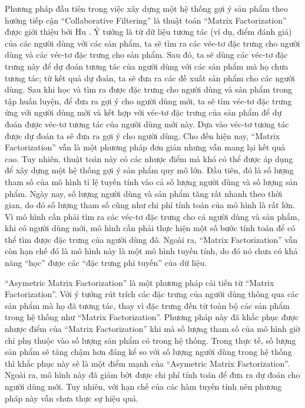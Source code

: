 Phương pháp đầu tiên trong việc xây dựng một hệ thống gợi ý sản phẩm theo hướng tiếp cận ``Collaborative Filtering'' là thuật toán ``Matrix Factorization'' được giới thiệu bởi Hu \cite{MF}. 
Ý tưởng là từ dữ liệu tương tác (ví dụ, điểm đánh giá) của các người dùng với các sản phẩm, ta sẽ tìm ra các véc-tơ đặc trưng cho người dùng và các véc-tơ đặc trưng cho sản phẩm. 
Sau đó, ta sẽ dùng các véc-tơ đặc trưng này để dự đoán tương tác của người dùng với các sản phẩm mà họ chưa tương tác; từ kết quả dự đoán, ta sẽ đưa ra các đề xuất sản phẩm cho các người dùng.
Sau khi học và tìm ra được đặc trưng cho người dùng và sản phẩm trong tập huấn luyện, để đưa ra gợi ý cho người dùng mới, ta sẽ tìm véc-tơ đặc trưng ứng với người dùng mới và kết hợp với véc-tơ đặc trưng của sản phẩm để dự đoán được véc-tơ tương tác của người dùng mới này.
Dựa vào véc-tơ tương tác được dự đoán ta sẽ đưa ra gợi ý cho người dùng.
Cho đến hiện nay, ``Matrix Factorization'' vẫn  là một phương pháp đơn giản nhưng vẫn mang lại kết quả cao.
Tuy nhiên, thuật toán này có các nhược điểm mà khó có thể được áp dụng để xây dựng một hệ thống gợi ý sản phẩm quy mô lớn.
Đầu tiên, đó là số lượng tham số của mô hình tỉ lệ tuyến tính vào cả số lượng người dùng và số lượng sản phẩm. 
Ngày nay, số lượng người dùng và sản phẩm tăng rất nhanh theo thời gian, do đó số lượng tham số cũng như chi phí tính toán của mô hình là rất lớn.
Vì mô hình cần phải tìm ra các véc-tơ đặc trưng cho cả người dùng và sản phẩm, khi có người dùng mới, mô hình cần phải thực hiện một số bước tính toán để có thể tìm được đặc trưng của người dùng đó.
Ngoài ra, ``Matrix Factorization'' vẫn còn hạn chế đó là mô hình này là một mô hình tuyến tính, do đó nó chưa có khả năng ``học'' được các ``đặc trưng phi tuyến'' của dữ liệu.

``Asymetric Matrix Factorization'' là một phương pháp cải tiến từ ``Matrix Factorization''.
Với ý tưởng rút trích các đặc trưng của người dùng thông qua các sản phẩm mà họ đã tương tác, thay vì đặc trưng đến từ toàn bộ các sản phẩm trong hệ thống như ``Matrix Factorization''.
Phương pháp này đã khắc phục được nhược điểm của ``Matrix Factorization'' khi mà số lượng tham số của mô hình giờ chỉ phụ thuộc vào số lượng sản phẩm có trong hệ thống. 
Trong thực tế, số lượng sản phẩm sẽ tăng chậm hơn đáng kể so với số lượng người dùng trong hệ thống thì khắc phục này sẽ là một điểm mạnh của ``Asymetric Matrix Factorization''. 
Ngoài ra, mô hình này đã giảm bớt được chi phí tính toán để đưa ra dự đoán cho người dùng mới. 
Tuy nhiên, với hạn chế của các hàm tuyến tính nên phương pháp này vẫn chưa thực sự hiệu quả.

